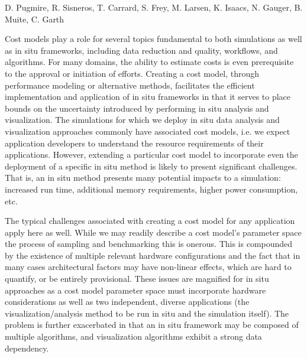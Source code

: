 \label{sec:costModels}
\license

 D. Pugmire, R. Sisneros, T. Carrard, S. Frey, M. Larsen, K. Isaacs, N. Gauger, B. Muite, C. Garth

\begin{refsection}
Cost models play a role for several topics fundamental to both simulations as well as in situ frameworks, including data reduction and quality, workflows, and algorithms.  
For many domains, the ability to estimate costs is even prerequisite to the approval or initiation of efforts. 
Creating a cost model, through performance modeling or alternative methods, facilitates the efficient implementation and application of in situ frameworks in that it serves to place bounds on the uncertainty introduced by performing in situ analysis and visualization. 
The simulations for which we deploy in situ data analysis and visualization approaches commonly have associated cost models, i.e. we expect application developers to understand the resource requirements of their applications.  
However, extending a particular cost model to incorporate even the deployment of a specific in situ method is likely to present significant challenges.  That is, an in situ method presents many potential impacts to a simulation: increased run time, additional memory requirements, higher power consumption, etc.

 The typical challenges associated with creating a cost model for any application apply here as well. 
While we may readily describe a cost model’s parameter space the process of sampling and benchmarking this is onerous.  
This is compounded by the existence of multiple relevant hardware configurations and the fact that in many cases architectural factors may have non-linear effects, which are hard to quantify, or be entirely provisional.  
These issues are magnified for in situ approaches as a cost model parameter space must incorporate hardware considerations as well as two independent, diverse applications (the visualization/analysis method to be run in situ and the simulation itself).  
The problem is further exacerbated in that an in situ framework may be composed of multiple algorithms, and visualization algorithms exhibit a strong data dependency.


\end{refsection}
